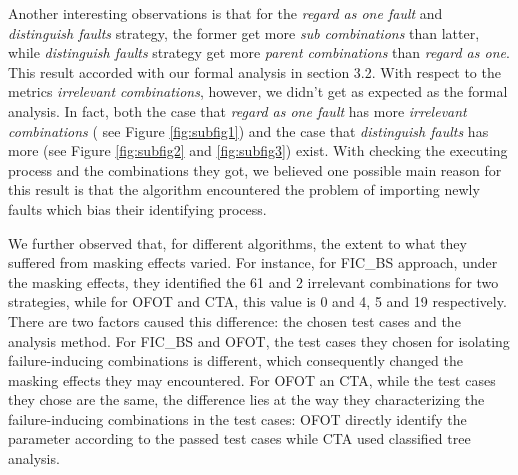 \documentclass{sig-alternate}
\begin{document}
Another interesting observations is that for the \emph{regard as one fault} and \emph{distinguish faults} strategy, the former get more \emph{sub combinations} than latter, while \emph{distinguish faults} strategy get more \emph{parent combinations} than \emph{regard as one}. This result accorded with our formal analysis in section 3.2. With respect to the metrics \emph{irrelevant combinations}, however, we didn't get as expected as the formal analysis. In fact, both the case that \emph{regard as one fault} has more \emph{irrelevant combinations} ( see Figure \ref{fig:subfig1}) and the case that \emph{distinguish faults} has more (see Figure \ref{fig:subfig2} and \ref{fig:subfig3}) exist. With checking the executing process and the combinations they got, we believed one possible main reason for this result is that the algorithm encountered the problem of importing newly faults which bias their identifying process.


We further observed that, for different algorithms, the extent to what they suffered from masking effects varied. For instance, for FIC\_BS approach, under the masking effects, they  identified the 61 and 2 irrelevant combinations for two strategies, while for OFOT and CTA, this value is 0 and 4, 5 and 19 respectively. There are two factors caused this difference: the chosen test cases and the analysis method. For FIC\_BS and OFOT, the test cases they chosen for isolating failure-inducing combinations is different, which consequently changed the masking effects they may encountered. For OFOT an CTA, while the test cases they chose are the same, the difference lies at the way they characterizing the failure-inducing combinations in the test cases: OFOT directly identify the parameter according to the passed test cases while CTA used classified tree analysis.

%
\end{document}
